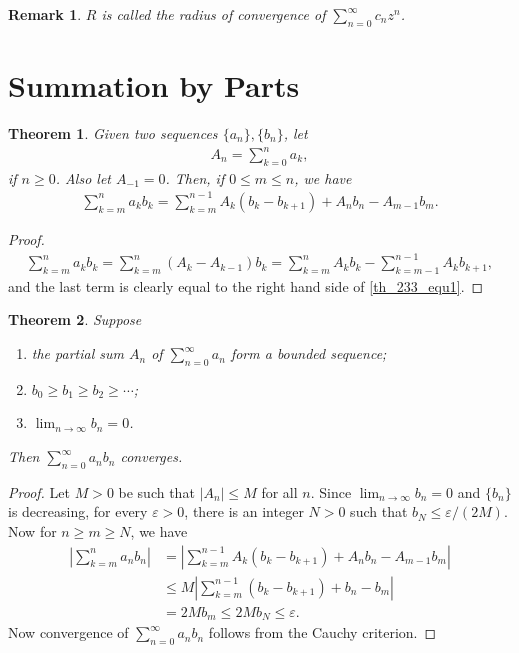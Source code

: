 \documentclass[10pt]{book}
\newtheorem{theorem}{Theorem}[chapter]
\newtheorem{remark}{Remark}[chapter]
\theoremstyle{definition}
\numberwithin{equation}{chapter}
\begin{document}
\begin{remark}
$R$ is called the radius of convergence of $\sum^\infty_{n=0} c_n z^n$.
\end{remark}

\medskip


\section{Summation by Parts}

\begin{theorem}
Given two sequences $\{a_n\}, \{b_n\}$, let
\begin{align*}
    A_n = \sum^n_{k=0} a_k,
\end{align*}
if $n \geq 0$. Also let $A_{-1} = 0$. Then, if $0 \leq m \leq n$, we have
\begin{align}\label{th_233_equ1}
    \sum^n_{k=m} a_k b_k = \sum^{n-1}_{k=m} A_k(b_k - b_{k+1}) + A_n b_n - A_{m-1} b_m.
\end{align}
\end{theorem}
\begin{proof}
\begin{align*}
    \sum^n_{k=m} a_k b_k = \sum^n_{k=m} (A_k - A_{k-1}) b_k = \sum^n_{k=m} A_k b_k - \sum^{n-1}_{k=m-1} A_k b_{k+1},
\end{align*}
and the last term is clearly equal to the right hand side of \eqref{th_233_equ1}.
\end{proof}

\medskip

\begin{theorem}\label{th_234}
Suppose
\begin{enumerate}[label=(\alph*)]
    \item the partial sum $A_n$ of $\sum^\infty_{n=0} a_n$ form a bounded sequence;
    
    \item $b_0 \geq b_1 \geq b_2 \geq \cdots$;
    
    \item $\lim_{n\to\infty} b_n = 0$.
\end{enumerate}
Then $\sum^\infty_{n=0} a_n b_n$ converges.
\end{theorem}
\begin{proof}
Let $M > 0$ be such that $\left|A_n\right| \leq M$ for all $n$. Since $\lim_{n\to\infty} b_n = 0$ and $\{b_n\}$ is decreasing, for every $\varepsilon > 0$, there is an integer $N > 0$ such that $b_N \leq \varepsilon/(2M)$. Now for $n \geq m \geq N$, we have
\begin{align*}
    \left|\sum^n_{k=m} a_nb_n\right| & = \left|\sum^{n-1}_{k=m} A_k(b_k - b_{k+1}) + A_n b_n - A_{m-1} b_m\right| \\
    & \leq M \left|\sum^{n-1}_{k=m} (b_k - b_{k+1}) + b_n - b_m\right| \\
    & = 2M b_m \leq 2M b_N \leq \varepsilon.
\end{align*}
Now convergence of $\sum^\infty_{n=0} a_n b_n$ follows from the Cauchy criterion.
\end{proof}
\end{document}
